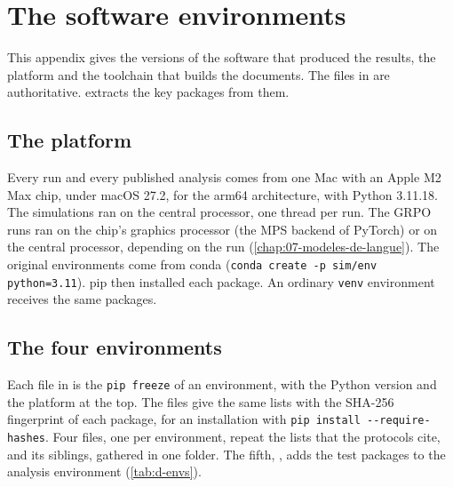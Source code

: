 \chapter{The software environments}
\label{chap:D-environnements}

This appendix gives the versions of the software that produced the results, the platform and the
toolchain that builds the documents. The files in  are authoritative. 
extracts the key packages from them.

\section{The platform}
\label{sec:d-plateforme}

Every run and every published analysis comes from one Mac with an Apple M2 Max chip, under
macOS 27.2, for the arm64 architecture, with Python 3.11.18. The simulations ran on the central
processor, one thread per run. The GRPO runs ran on the chip's graphics processor (the MPS backend of
PyTorch) or on the central processor, depending on the run (\cref{chap:07-modeles-de-langue}). The
original environments come from conda (\texttt{conda create -p sim/env python=3.11}). pip then
installed each package. An ordinary \texttt{venv} environment receives the same packages.

\section{The four environments}
\label{sec:d-envs}

Each file in  is the \texttt{pip freeze} of an environment, with the Python
version and the platform at the top. The  files give the same lists with the SHA-256
fingerprint of each package, for an installation with \texttt{pip install -{}-require-hashes}. Four
 files, one per environment, repeat the lists that the protocols cite,
 and its siblings, gathered in one folder. The fifth, ,
adds the test packages to the analysis environment (\cref{tab:d-envs}).

